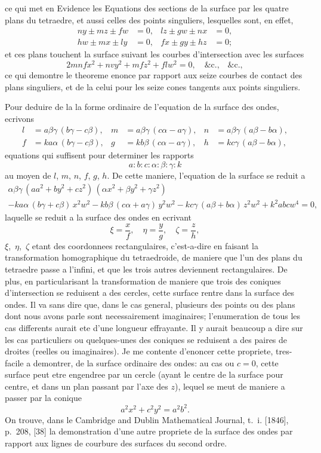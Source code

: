 \documentclass[11pt,a4paper]{article}
\begin{document}
\newpage
ce qui met en Evidence les Equations des sections de la surface par les quatre plans du tetraedre, et aussi celles des points singuliers, lesquelles sont, en effet,
\begin{align*}
ny \pm mz \pm fw &= 0, & lz \pm gw \pm nx &= 0,\\
hw \pm mx \pm ly &= 0, & fx \pm gy \pm hz &= 0;
\end{align*}
et ces plans touchent la surface suivant les courbes d'intersection avec les surfaces
\[
2mnfx^2 + nvy^2 + mfz^2 + flw^2 = 0, \quad \&\text{c.,}\quad \&\text{c.},
\]
ce qui demontre le theoreme enonce par rapport aux seize courbes de contact des plans singuliers, et de la celui pour les seize cones tangents aux points singuliers.

Pour deduire de la la forme ordinaire de l'equation de la surface des ondes, ecrivons
\begin{align*}
l &= a\beta\gamma\,(b\gamma - c\beta), & m &= a\beta\gamma\,(c\alpha - a\gamma), & n &= a\beta\gamma\,(a\beta - b\alpha),\\
f &= ka\alpha\,(b\gamma - c\beta), & g &= kb\beta\,(c\alpha - a\gamma), & h &= kc\gamma\,(a\beta - b\alpha),
\end{align*}
equations qui suffisent pour determiner les rapports
\[
a : b : c : \alpha : \beta : \gamma : k
\]
au moyen de $l$, $m$, $n$, $f$, $g$, $h$. De cette maniere, l'equation de la surface se reduit a
\begin{multline*}
\alpha\beta\gamma\,(aa^2 + by^2 + cz^2)\,(\alpha x^2 + \beta y^2 + \gamma z^2) \\
- ka\alpha\,(b\gamma + c\beta)\,x^2w^2 - kb\beta\,(c\alpha + a\gamma)\,y^2w^2 - kc\gamma\,(a\beta + b\alpha)\,z^2w^2 + k^2abcw^4 = 0,
\end{multline*}
laquelle se reduit a la surface des ondes en ecrivant
\[
\xi = \frac{x}{f}, \quad \eta = \frac{y}{g}, \quad \zeta = \frac{z}{h},
\]
$\xi$,~$\eta$,~$\zeta$ etant des coordonnees rectangulaires, c'est-a-dire en faisant la transformation homographique du tetraedroide, de maniere que l'un des plans du tetraedre passe a l'infini, et que les trois autres deviennent rectangulaires. De plus, en particularisant la transformation de maniere que trois des coniques d'intersection se reduisent a des cercles, cette surface rentre dans la surface des ondes. Il va sans dire que, dans le cas general, plusieurs des points ou des plans dont nous avons parle sont necessairement imaginaires; l'enumeration de tous les cas differents aurait ete d'une longueur effrayante. Il y aurait beaucoup a dire sur les cas particuliers ou quelques-unes des coniques se reduisent a des paires de droites (reelles ou imaginaires). Je me contente d'enoncer cette propriete, tres-facile a demontrer, de la surface ordinaire des ondes: au cas ou $c=0$, cette surface peut etre engendree par un cercle (ayant le centre de la surface pour centre, et dans un plan passant par l'axe des $z$), lequel se meut de maniere a passer par la conique
\[
a^2x^2 + c^2y^2 = a^2b^2.
\]
On trouve, dans le Cambridge and Dublin Mathematical Journal, t.~i. [1846], p.~208, [38] la demonstration d'une autre propriete de la surface des ondes par rapport aux lignes de courbure des surfaces du second ordre.
\end{document}
